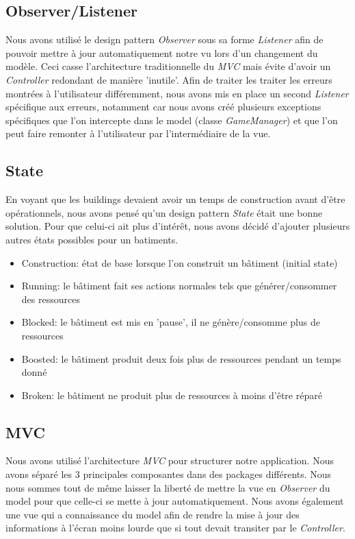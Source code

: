 \documentclass{article}
\begin{document}
\subsection{Observer/Listener}
Nous avons utilisé le design pattern \textit{Observer} sous sa forme \textit{Listener} afin de pouvoir mettre à jour automatiquement
notre vu lors d'un changement du modèle. Ceci casse l'architecture traditionnelle du \textit{MVC} mais évite d'avoir un \textit{Controller}
redondant de manière 'inutile'. Afin de traiter les traiter les erreurs montrées à l'utilisateur différemment, nous avons mis en place
un second \textit{Listener} spécifique aux erreurs, notamment car nous avons créé plusieurs exceptions spécifiques que l'on intercepte
dans le model (classe \textit{GameManager}) et que l'on peut faire remonter à l'utilisateur par l'intermédiaire de la vue.

\subsection{State}
En voyant que les buildings devaient avoir un temps de construction avant d'être opérationnels, nous avons pensé qu'un design pattern
\textit{State} était une bonne solution. Pour que celui-ci ait plus d'intérêt, nous avons décidé d'ajouter plusieurs autres états possibles
pour un batiments.
\begin{itemize}
    \item Construction: état de base lorsque l'on construit un bâtiment (initial state)
    \item Running: le bâtiment fait ses actions normales tels que générer/consommer des ressources
    \item Blocked: le bâtiment est mis en 'pause', il ne génère/consomme plus de ressources
    \item Boosted: le bâtiment produit deux fois plus de ressources pendant un temps donné
    \item Broken: le bâtiment ne produit plus de ressources à moins d'être réparé
\end{itemize}

\subsection{MVC}
Nous avons utilisé l'architecture \textit{MVC} pour structurer notre application. Nous avons séparé les 3 principales composantes
dans des packages différents. Nous nous sommes tout de même laisser la liberté de mettre la vue en \textit{Observer} du model pour
que celle-ci se mette à jour automatiquement. Nous avons également une vue qui a connaissance du model afin de rendre la mise à
jour des informations à l'écran moins lourde que si tout devait transiter par le \textit{Controller}.
\end{document}

